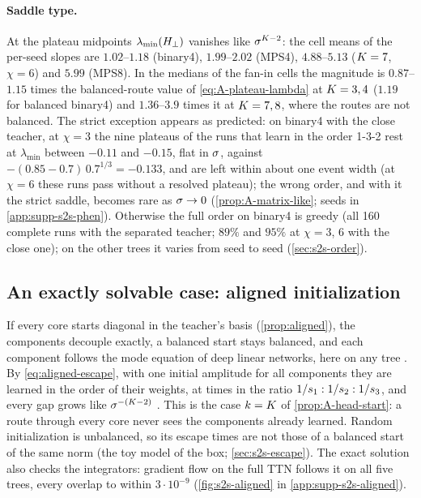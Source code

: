 \paragraph{Saddle type.}
\empirical{} At the plateau midpoints $\lambda_{\min}(H_{\perp})$ vanishes like $\sigma^{K-2}$: the cell means of
the per-seed slopes are $1.02$--$1.18$ (binary4), $1.99$--$2.02$ (MPS4), $4.88$--$5.13$ ($K=7$, $\chi=6$) and
$5.99$ (MPS8). In the medians of the fan-in cells the magnitude is $0.87$--$1.15$ times the balanced-route value
of \eqref{eq:A-plateau-lambda} at $K=3,4$ ($1.19$ for balanced binary4) and $1.36$--$3.9$ times it at
$K=7,8$, where the routes are not balanced. The strict exception appears as predicted: on binary4 with the
close teacher, at $\chi=3$ the nine plateaus of the runs that learn in the order 1-3-2 rest at $\lambda_{\min}$
between $-0.11$ and $-0.15$, flat in $\sigma$, against $-(0.85-0.7)\,0.7^{1/3}=-0.133$, and are left within about one
event width (at $\chi=6$ these runs pass without a resolved plateau); the wrong order, and
with it the strict saddle, becomes rare as $\sigma\to0$ (\cref{prop:A-matrix-like}; seeds in
\cref{app:supp-s2s-phen}). Otherwise the full order on binary4 is greedy (all 160 complete runs with the
separated teacher; $89\%$ and $95\%$ at $\chi=3$, $6$ with the close one); on the other trees it varies from seed
to seed (\cref{sec:s2s-order}).  

\subsection{An exactly solvable case: aligned initialization}\label{sec:s2s-aligned}

If every core starts diagonal in the teacher's basis (\cref{prop:aligned}), the components decouple exactly, a
balanced start stays balanced, and each component follows the mode equation of deep linear networks, here on any
tree \proven{} . By \eqref{eq:aligned-escape}, with one initial
amplitude for all components they are learned in the order of their weights, at times in the ratio
$1/s_{1}:1/s_{2}:1/s_{3}$, and every gap grows like $\sigma^{-(K-2)}$ . This
is the case $k=K$ of \cref{prop:A-head-start}: a route through every core never sees the components already
learned. Random initialization is unbalanced, so its escape times are not those of a balanced start of the same
norm (the toy model of the box; \cref{sec:s2s-escape}). The exact solution also checks the integrators: gradient
flow on the full TTN follows it on all five trees, every overlap to within $3\cdot10^{-9}$ \empirical{}
(\cref{fig:s2s-aligned} in \cref{app:supp-s2s-aligned}).

